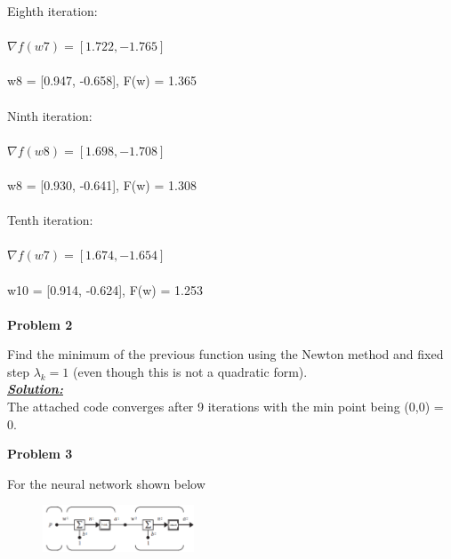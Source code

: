 \documentclass{article}
\begin{document}
\noindent Eighth iteration: \\ \\
$\nabla f(w7)= [1.722,-1.765]$ \\ \\
w8 = [0.947, -0.658], F(w) = 1.365 \\ \\

\noindent Ninth iteration: \\ \\
$\nabla f(w8)= [1.698,-1.708]$ \\ \\
w8 = [0.930, -0.641], F(w) = 1.308 \\ \\

\noindent Tenth iteration: \\ \\
$\nabla f(w7)= [1.674,-1.654]$ \\ \\
w10 = [0.914, -0.624], F(w) = 1.253 \\ \\







\newpage
\noindent \textbf{Problem 2}

\noindent Find the minimum of the previous function using the Newton method and fixed step $ \lambda_k = 1$ (even though this is not a quadratic form). \\

\noindent \underline{\textbf{\textit{Solution:}}} \\ 

\noindent The attached code converges after 9 iterations with the min point being (0,0) = 0.



\vspace{2cm}
\noindent \textbf{Problem 3}

\noindent For the neural network shown below

\begin{figure}[h]
  \centering
  \includegraphics[width=0.4\textwidth]{pr3_a.png}
  
\end{figure}
\end{document}
